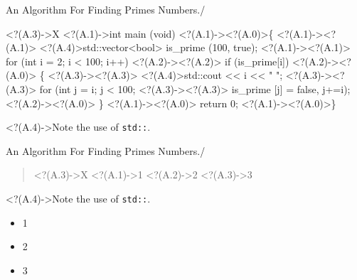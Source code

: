 \documentclass{beamer}
\begin{document}

\begin{frame}[fragile]
  {An Algorithm For Finding Primes Numbers.}{\insertframenumber/\insertslidenumber}
\makeatletter
\begin{semiverbatim}
\only<?(A.3)->{X}
\uncover<?(A.1)->{\alert<0>{int main (void)}}
\uncover<?(A.1)->{\alert<?(A.0)>{\{}}
\uncover<?(A.1)->{\alert<?(A.1)>{  \alert<?(A.4)>{std::}vector<bool> is_prime (100, true);}}
\uncover<?(A.1)->{\alert<?(A.1)>{  for (int i = 2; i < 100; i++)}}
\uncover<?(A.2)->{\alert<?(A.2)>{    if (is_prime[i])}}
\uncover<?(A.2)->{\alert<?(A.0)>{      \{}}
\uncover<?(A.3)->{\alert<?(A.3)>{        \alert<?(A.4)>{std::}cout << i << " ";}}
\uncover<?(A.3)->{\alert<?(A.3)>{        for (int j = i; j < 100;}}
\uncover<?(A.3)->{\alert<?(A.3)>{             is_prime [j] = false, j+=i);}}
\uncover<?(A.2)->{\alert<?(A.0)>{      \}}}
\uncover<?(A.1)->{\alert<?(A.0)>{  return 0;}}
\uncover<?(A.1)->{\alert<?(A.0)>{\}}}
\end{semiverbatim}

  \visible<?(A.4)->{Note the use of \alert{\texttt{std::}}.}
\makeatother
\end{frame}

\begin{frame}{An Algorithm For Finding Primes Numbers.}{\insertframenumber/\insertslidenumber}
\begin{verse}
\ttfamily
\visible<?(A.3)->{X}
\uncover<?(A.1)->{1 }
\uncover<?(A.2)->{2 }
\uncover<?(A.3)->{3 }
\end{verse}

  \visible<?(A.4)->{Note the use of \alert{\texttt{std::}}.}
  \makeatother
\end{frame}
\begin{frame}{\insertframenumber}{\insertslidenumber}
\begin{itemize}[<+->]
\item 1 
\item 2 
\item 3 
\end{itemize}
\end{frame}
\end{document}
